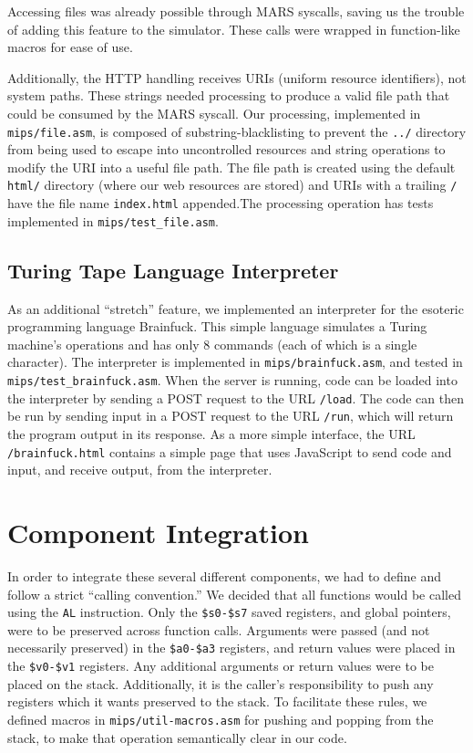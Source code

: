 \documentclass[journal,10pt]{IEEEtran}
\begin{document}
Accessing files was already possible through MARS syscalls, saving us the
trouble of adding this feature to the simulator. These calls were wrapped in
function-like macros for ease of use.

Additionally, the HTTP handling receives URIs (uniform resource identifiers),
not system paths. These strings needed processing to produce a valid file path
that could be consumed by the MARS syscall. Our processing, implemented in
\texttt{mips/file.asm}, is composed of substring-blacklisting to prevent the
\texttt{../} directory from being used to escape into uncontrolled resources and
string operations to modify the URI into a useful file path. The file path is
created using the default \texttt{html/} directory (where our web resources are
stored) and URIs with a trailing \texttt{/} have the file name
\texttt{index.html} appended.The processing operation has tests implemented in
\texttt{mips/test\_file.asm}.

\subsection{Turing Tape Language Interpreter}

As an additional ``stretch'' feature, we implemented an interpreter for the
esoteric programming language Brainfuck\cite{Mpreu/preller}.  This simple
language simulates a Turing machine's operations and has only 8 commands (each
of which is a single character).  The interpreter is implemented in
\texttt{mips/brainfuck.asm}, and tested in \texttt{mips/test\_brainfuck.asm}.
When the server is running, code can be loaded into the interpreter by sending a
POST request to the URL \texttt{/load}.  The code can then be run by sending
input in a POST request to the URL \texttt{/run}, which will return the program
output in its response.  As a more simple interface, the URL
\texttt{/brainfuck.html} contains a simple page that uses JavaScript to send
code and input, and receive output, from the interpreter.

\section{Component Integration}

In order to integrate these several different components, we had to define and
follow a strict ``calling convention.''  We decided that all functions would be
called using the \texttt{AL} instruction.  Only the \texttt{\$s0-\$s7} saved
registers, and global pointers, were to be preserved across function calls.
Arguments were passed (and not necessarily preserved) in the \texttt{\$a0-\$a3}
registers, and return values were placed in the \texttt{\$v0-\$v1} registers.
Any additional arguments or return values were to be placed on the stack.
Additionally, it is the caller's responsibility to push any registers which it
wants preserved to the stack.  To facilitate these rules, we defined macros in
\texttt{mips/util-macros.asm} for pushing and popping from the stack, to make
that operation semantically clear in our code.
\end{document}
